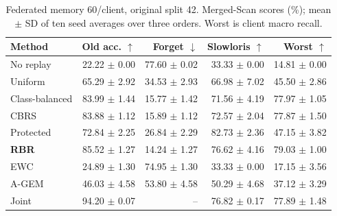 \begin{table}[t]
\centering
\caption{Federated memory 60/client, original split 42. Merged-Scan scores (\%); mean $\pm$ SD of ten seed averages over three orders. Worst is client macro recall.}
\label{tab:main}
\footnotesize
\setlength{\tabcolsep}{2.5pt}
\begin{tabular}{lrrrr}
\toprule
Method & Old acc. $\uparrow$ & Forget $\downarrow$ & Slowloris $\uparrow$ & Worst $\uparrow$\\
\midrule
No replay & 22.22 $\pm$ 0.00 & 77.60 $\pm$ 0.02 & 33.33 $\pm$ 0.00 & 14.81 $\pm$ 0.00\\
Uniform & 65.29 $\pm$ 2.92 & 34.53 $\pm$ 2.93 & 66.98 $\pm$ 7.02 & 45.50 $\pm$ 2.86\\
Class-balanced & 83.99 $\pm$ 1.44 & 15.77 $\pm$ 1.42 & 71.56 $\pm$ 4.19 & 77.97 $\pm$ 1.05\\
CBRS & 83.88 $\pm$ 1.12 & 15.89 $\pm$ 1.12 & 72.57 $\pm$ 2.04 & 77.87 $\pm$ 1.50\\
Protected & 72.84 $\pm$ 2.25 & 26.84 $\pm$ 2.29 & 82.73 $\pm$ 2.36 & 47.15 $\pm$ 3.82\\
\textbf{RBR} & 85.52 $\pm$ 1.27 & 14.24 $\pm$ 1.27 & 76.62 $\pm$ 4.16 & 79.03 $\pm$ 1.00\\
EWC & 24.89 $\pm$ 1.30 & 74.95 $\pm$ 1.30 & 33.33 $\pm$ 0.00 & 17.15 $\pm$ 3.56\\
A-GEM & 46.03 $\pm$ 4.58 & 53.80 $\pm$ 4.58 & 50.29 $\pm$ 4.68 & 37.12 $\pm$ 3.29\\
Joint & 94.20 $\pm$ 0.07 & -- & 76.82 $\pm$ 0.17 & 77.89 $\pm$ 1.48\\
\bottomrule
\end{tabular}
\end{table}
